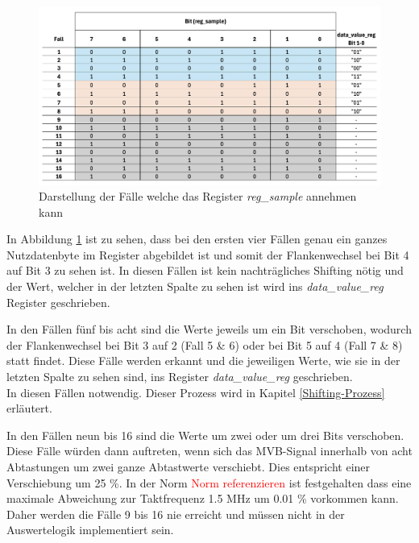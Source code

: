 \begin{figure}[H]
    \centering
    \includegraphics[width=1\linewidth]{Figures//Chap3//FPGA/FPGA_decoding_case.png}
    \caption{Darstellung der Fälle welche das Register \textit{reg\_sample} annehmen kann}
    \label{fig:FPGAreg_sampleCases}
\end{figure}

In Abbildung \ref{fig:FPGAreg_sampleCases} ist zu sehen, dass bei den ersten vier
Fällen genau ein ganzes Nutzdatenbyte im Register abgebildet ist und somit der 
Flankenwechsel bei Bit 4 auf Bit 3 zu sehen ist. In diesen Fällen ist kein 
nachträgliches Shifting nötig und der Wert, welcher in der letzten Spalte zu
sehen ist wird ins \textit{data\_value\_reg} Register geschrieben.

In den Fällen fünf bis acht sind die Werte jeweils um ein Bit verschoben, wodurch
der Flankenwechsel bei Bit 3 auf 2 (Fall 5 \& 6) oder bei Bit 5 auf 4
(Fall 7 \& 8) statt findet. Diese Fälle werden erkannt und die jeweiligen Werte, wie
sie in der letzten Spalte zu sehen sind, ins Register \textit{data\_value\_reg} 
geschrieben.\\
In diesen Fällen notwendig. Dieser Prozess wird in Kapitel \ref{Shifting-Prozess}
erläutert.

In den Fällen neun bis 16 sind die Werte um zwei oder um drei Bits verschoben. Diese Fälle würden dann auftreten, wenn sich das MVB-Signal innerhalb von acht
Abtastungen um zwei ganze Abtastwerte verschiebt. Dies entspricht einer
Verschiebung um 25 \%. In der Norm \textcolor{red}{Norm referenzieren} ist
festgehalten dass eine maximale Abweichung zur Taktfrequenz 1.5 MHz um 0.01 \% vorkommen kann.\\
Daher werden die Fälle 9 bis 16 nie erreicht und müssen nicht in der Auswertelogik
implementiert sein.
 

